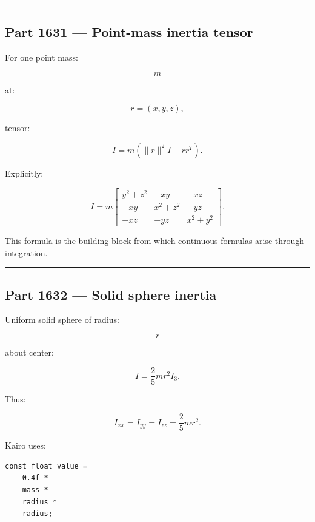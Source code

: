\begin{center}\rule{0.5\linewidth}{0.5pt}\end{center}

\subsection{Part 1631 --- Point-mass inertia tensor}\label{06-engine-ii-ch035-part-1631-point-mass-inertia-tensor}

\hypertarget{06-engine-ii-ch035-part-1631-point-mass-inertia-tensor}{}

For one point mass:

\[
m
\]

at:

\[
r=(x,y,z),
\]

tensor:

\[
\boxed{
I
=
m
(
\|r\|^2I-r r^T
).
}
\]

Explicitly:

\[
I
=
m
\begin{bmatrix}
y^2+z^2&-xy&-xz\\
-xy&x^2+z^2&-yz\\
-xz&-yz&x^2+y^2
\end{bmatrix}.
\]

This formula is the building block from which continuous formulas arise through integration.

\begin{center}\rule{0.5\linewidth}{0.5pt}\end{center}

\subsection{Part 1632 --- Solid sphere inertia}\label{06-engine-ii-ch035-part-1632-solid-sphere-inertia}

\hypertarget{06-engine-ii-ch035-part-1632-solid-sphere-inertia}{}

Uniform solid sphere of radius:

\[
r
\]

about center:

\[
\boxed{
I
=
\frac25mr^2I_3.
}
\]

Thus:

\[
I_{xx}
=
I_{yy}
=
I_{zz}
=
\frac25mr^2.
\]

Kairo uses:

\begin{verbatim}
const float value =
    0.4f *
    mass *
    radius *
    radius;
\end{verbatim}

